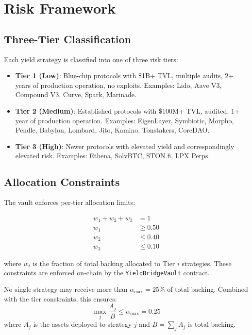 \section{Risk Framework}
\label{sec:risk}

\subsection{Three-Tier Classification}

\begin{definition}
Each yield strategy is classified into one of three risk tiers:
\begin{itemize}[nosep]
  \item \textbf{Tier 1 (Low)}: Blue-chip protocols with \$1B+ TVL, multiple audits, 2+ years of production operation, no exploits. Examples: Lido, Aave V3, Compound V3, Curve, Spark, Marinade.
  \item \textbf{Tier 2 (Medium)}: Established protocols with \$100M+ TVL, audited, 1+ year of production operation. Examples: EigenLayer, Symbiotic, Morpho, Pendle, Babylon, Lombard, Jito, Kamino, Tonstakers, CoreDAO.
  \item \textbf{Tier 3 (High)}: Newer protocols with elevated yield and correspondingly elevated risk. Examples: Ethena, SolvBTC, STON.fi, LPX Perps.
\end{itemize}
\end{definition}

\subsection{Allocation Constraints}

The vault enforces per-tier allocation limits:

\begin{equation}\label{eq:allocation}
\begin{aligned}
  w_1 + w_2 + w_3 &= 1 \\
  w_1 &\geq 0.50 \\
  w_2 &\leq 0.40 \\
  w_3 &\leq 0.10
\end{aligned}
\end{equation}

where $w_i$ is the fraction of total backing allocated to Tier $i$ strategies. These constraints are enforced on-chain by the \texttt{YieldBridgeVault} contract.

\begin{theorem}\label{thm:diversification}
No single strategy may receive more than $\alpha_{\max} = 25\%$ of total backing. Combined with the tier constraints, this ensures:
\begin{equation}
  \max_j \frac{A_j}{B} \leq \alpha_{\max} = 0.25
\end{equation}
where $A_j$ is the assets deployed to strategy $j$ and $B = \sum_j A_j$ is total backing.
\end{theorem}


